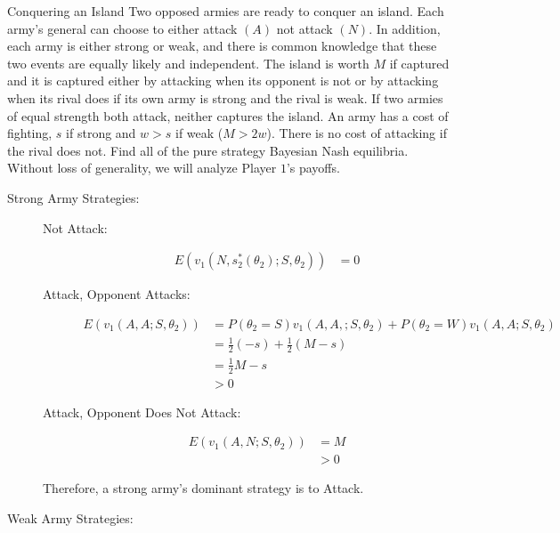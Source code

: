 \documentclass[8pt]{extarticle}
\title{}
\author{}
\date{}
\begin{document}
  \begin{problem}{Conquering an Island}
    Two opposed armies are ready to conquer an island. Each army's general can choose to either attack $(A)$ not attack $(N)$. In addition, each army is either strong or weak, and there is common knowledge that these two events are equally likely and independent. The island is worth $M$ if captured and it is captured either by attacking when its opponent is not or by attacking when its rival does if its own army is strong and the rival is weak. If two armies of equal strength both attack, neither captures the island. An army has a cost of fighting, $s$ if strong and $w > s$ if weak ($M > 2w$). There is no cost of attacking if the rival does not. Find all of the pure strategy Bayesian Nash equilibria.
    \tcblower
    Without loss of generality, we will analyze Player $1$'s payoffs.
    \begin{description}
      \item[Strong Army Strategies:]\hfill
        \begin{description}
          \item[Not Attack:]
            \begin{align*}
              E\left(v_1(N,s_2^{\ast}(\theta_2);S,\theta_2)\right) &= 0
            \end{align*}
          \item[Attack, Opponent Attacks:]
            \begin{align*}
              E\left(v_1(A,A;S,\theta_2)\right) &= P(\theta_2 = S)v_1(A,A,;S,\theta_2) + P(\theta_2 = W)v_1(A,A;S,\theta_2)\\
                                                &= \frac{1}{2}(-s) + \frac{1}{2}(M-s)\\
                                                &= \frac{1}{2}M - s\\
                                                &> 0
            \end{align*}
          \item[Attack, Opponent Does Not Attack:]
            \begin{align*}
              E\left(v_1(A,N;S,\theta_2)\right) &= M\\
                                                &> 0
            \end{align*}
        \end{description}
        Therefore, a strong army's dominant strategy is to Attack.
      \item[Weak Army Strategies:]

\end{description}
\end{problem}
\end{document}
